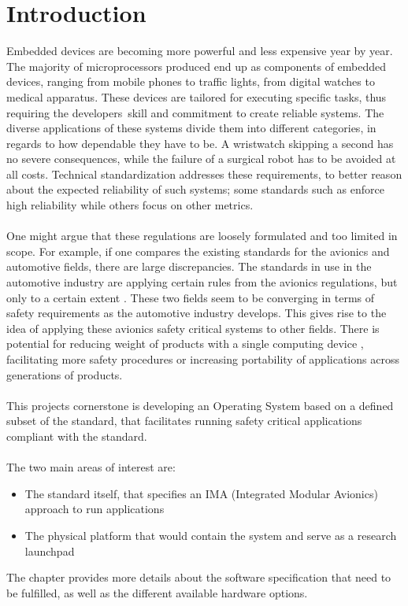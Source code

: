 \chapter{Introduction}\label{ch:introduction}

Embedded devices are becoming more powerful and less expensive year by year.
The majority of microprocessors produced end up as components of embedded devices,
ranging from mobile phones to traffic lights, from digital watches to medical apparatus.
These devices are tailored for executing specific tasks,
thus requiring the developers\textquotesingle\ skill and commitment to create reliable systems.
The diverse applications of these systems divide them into different categories,
in regards to how dependable they have to be. A wristwatch skipping a second has no severe consequences,
while the failure of a surgical robot has to be avoided at all costs.
Technical standardization addresses these requirements,
to better reason about the expected reliability of such systems;
some standards such as \arinc{}\cite{arinc_whole_standard} enforce high reliability while others focus on other metrics.
\\\\
One might argue that these regulations are loosely formulated and too limited in scope.
For example, if one compares the existing standards for the avionics and automotive fields,
there are large discrepancies.
The standards in use in the automotive industry are applying certain rules from the avionics regulations,
but only to a certain extent \cite{can_cars_fly}.
These two fields seem to be converging in terms of safety requirements as the automotive industry develops.
This gives rise to the idea of applying these avionics safety critical systems to other fields.
There is potential for reducing weight of products with a single 
computing device \cite{boeing_weight_reduction},
facilitating more safety procedures
or increasing portability of applications across generations of products.
\\\\
This project\textquotesingle s cornerstone is developing an Operating System based on a defined subset of the \arinc{} standard,
that facilitates running safety critical applications compliant with the \arinc{} standard.
\\\\
The two main areas of interest are:
\\
\begin{itemize}
\item The standard itself, that specifies an IMA 
(Integrated Modular Avionics) approach to run applications
\item The physical platform that would contain the system and serve as a research launchpad
\end{itemize}
The  chapter provides more details about the software specification that need to be fulfilled,
as well as the different available hardware options.
